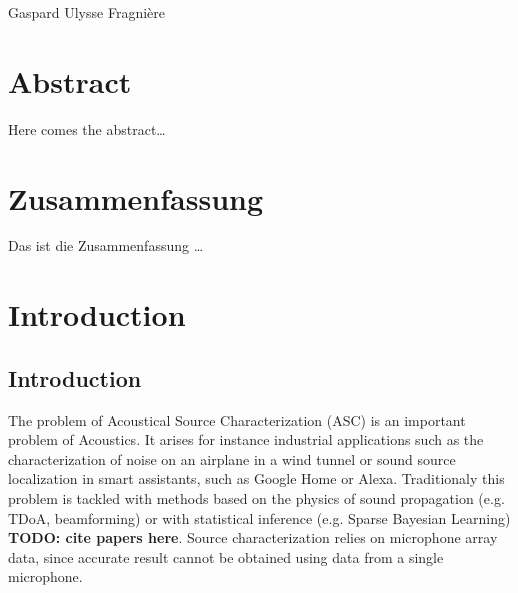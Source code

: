 \documentclass[11pt,a4paper,twoside]{report}
\begin{document}
\vspace{19mm}
\noindent
Gaspard Ulysse Fragnière \null

\cleardoublepage

\thispagestyle{empty}
\chapter*{Abstract}

Here comes the abstract\ldots

\clearpage

\thispagestyle{empty}
\german
\chapter*{Zusammenfassung}

Das ist die Zusammenfassung \ldots

\english
\cleardoublepage

\pagestyle{fancy}
\renewcommand{\chaptermark}[1]{\markboth{#1}{}}
\renewcommand{\sectionmark}[1]{\markright{\thesection\ #1}}
\fancyhead{}

\fancyhead[LO]{\scshape \contentsname}
\fancyhead[RE]{\scshape \contentsname}
\tableofcontents

\cleardoublepage

\setcounter{chapter}{0}
\setcounter{figure}{0}
\fancyhead[LO]{\rightmark}
\fancyhead[RO]{\scshape \chaptername\ \thechapter}
\fancyhead[LE]{\scshape \chaptername\ \thechapter}
\fancyhead[RE]{\textsc{\leftmark}}


\chapter{Introduction}

\section{Introduction}

The problem of Acoustical Source Characterization (ASC) is an important problem  of Acoustics. It arises for instance industrial applications such as the characterization of noise on an airplane in a wind tunnel or sound source localization in smart assistants, such as Google Home or Alexa. Traditionaly this problem is tackled with methods based on the physics of sound propagation (e.g. TDoA, beamforming) or with statistical inference (e.g. Sparse Bayesian Learning) \textbf{TODO: cite papers here}. Source characterization relies on microphone array data, since accurate result cannot be obtained using data from a single microphone. 
\end{document}
